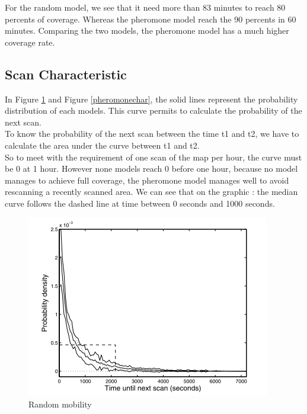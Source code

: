 For the random model, we see that it need more than 83 minutes to reach 80 percents of coverage. Whereas the pheromone model reach the 90 percents in 60 minutes. Comparing the two models, the pheromone model has a much higher coverage rate.

\newpage

\subsection{Scan Characteristic}

In Figure \ref{randomchar} and Figure \ref{pheromonechar}, the solid lines represent the probability distribution of each models. This curve permits to calculate the probability of the next scan.\\
To know the probability of the next scan between the time t1 and t2, we have to calculate the area under the curve between t1 and t2.\\
So to meet with the requirement of one scan of the map per hour, the curve must be 0 at 1 hour. However none models reach 0 before one hour, because no model manages to achieve full coverage, the pheromone model manages well to avoid rescanning a recently scanned area. We can see that on the graphic : the median curve follows the dashed line at time between 0 seconds and 1000 seconds.

\begin{figure}[!h]
\caption{\label{randomchar} Random mobility}
   \includegraphics{../images/random_scan_characteristic.png}
\end{figure}

